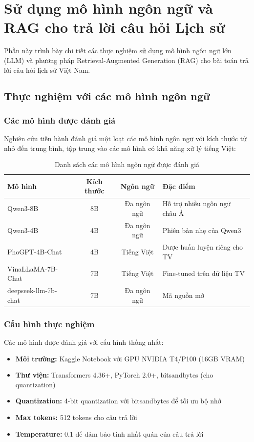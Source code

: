 \section{Sử dụng mô hình ngôn ngữ và RAG cho trả lời câu hỏi Lịch sử}
\label{sec:experiment2}

Phần này trình bày chi tiết các thực nghiệm sử dụng mô hình ngôn ngữ lớn (LLM) và phương pháp Retrieval-Augmented Generation (RAG) cho bài toán trả lời câu hỏi lịch sử Việt Nam.

\subsection{Thực nghiệm với các mô hình ngôn ngữ}

\subsubsection{Các mô hình được đánh giá}

Nghiên cứu tiến hành đánh giá một loạt các mô hình ngôn ngữ với kích thước từ nhỏ đến trung bình, tập trung vào các mô hình có khả năng xử lý tiếng Việt:

\begin{table}[H]
\centering
\caption{Danh sách các mô hình ngôn ngữ được đánh giá}
\label{tab:llm-models}
\begin{tabular}{|l|c|c|l|}
\hline
\textbf{Mô hình} & \textbf{Kích thước} & \textbf{Ngôn ngữ} & \textbf{Đặc điểm} \\
\hline
Qwen3-8B & 8B & Đa ngôn ngữ & Hỗ trợ nhiều ngôn ngữ châu Á \\
Qwen3-4B & 4B & Đa ngôn ngữ & Phiên bản nhẹ của Qwen3 \\
PhoGPT-4B-Chat & 4B & Tiếng Việt & Được huấn luyện riêng cho TV \\
VinaLLaMA-7B-Chat & 7B & Tiếng Việt & Fine-tuned trên dữ liệu TV \\
deepseek-llm-7b-chat & 7B & Đa ngôn ngữ & Mã nguồn mở \\
\hline
\end{tabular}
\end{table}

\subsubsection{Cấu hình thực nghiệm}

Các mô hình được đánh giá với cấu hình thống nhất:

\begin{itemize}
    \item \textbf{Môi trường:} Kaggle Notebook với GPU NVIDIA T4/P100 (16GB VRAM)
    \item \textbf{Thư viện:} Transformers 4.36+, PyTorch 2.0+, bitsandbytes (cho quantization)
    \item \textbf{Quantization:} 4-bit quantization với bitsandbytes để tối ưu bộ nhớ
    \item \textbf{Max tokens:} 512 tokens cho câu trả lời
    \item \textbf{Temperature:} 0.1 để đảm bảo tính nhất quán của câu trả lời
\end{itemize}

